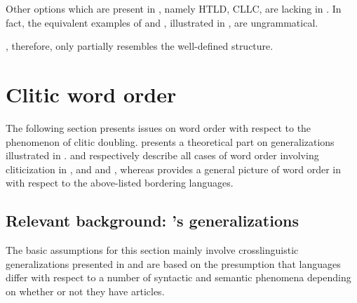 \documentclass[output=paper,
colorlinks,
citecolor=brown,
newtxmath
]{langscibook}
\begin{document}
\noindent Other options which are present in , namely HTLD, CLLC, are lacking in . In fact, the equivalent  examples of  and , illustrated in \citet{Cinque.Krapova2008}, are ungrammatical.


\z


\z

\noindent {}, therefore, only partially resembles the well-defined  structure.
%
%
\section{Clitic word order}
\label{sec:cliticorder}
The following section presents issues on word order with respect to the phenomenon of clitic doubling.  presents a theoretical part on generalizations illustrated in \citet{Boskovic2001,Boskovic2004a,Boskovic2004b,Boskovic2007,Boskovic2016}.  and  respectively describe all cases of word order involving cliticization in , and  and , whereas  provides a general picture of word order in  with respect to the above-listed bordering languages.

\subsection{Relevant background: \citeauthor{Boskovic2001}'s generalizations}
\label{subsec:assumptions}
The basic assumptions for this section mainly involve crosslinguistic generalizations presented in \citet{Boskovic2001,Boskovic2004a,Boskovic2004b,Boskovic2007,Boskovic2016} and are based on the presumption that languages differ with respect to a number of syntactic and semantic phenomena depending on whether or not they have articles.
\end{document}
